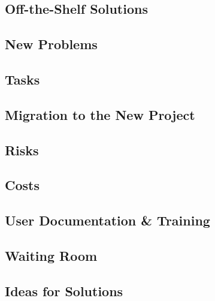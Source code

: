 \documentclass[titlepage]{article}
\begin{document}
\subsection{Off-the-Shelf Solutions}

\subsection{New Problems}

\subsection{Tasks}

\subsection{Migration to the New Project}

\subsection{Risks}

\subsection{Costs}

\subsection{User Documentation \& Training}

\subsection{Waiting Room}

\subsection{Ideas for Solutions}

\pagebreak
\printindex
\end{document}
